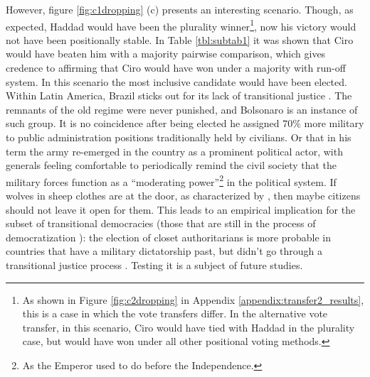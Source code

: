 \documentclass[hidelinks,11pt]{article}
\begin{document}
However, figure \ref{fig:c1dropping} (c) presents an interesting scenario.
Though, as expected, Haddad would have been the plurality winner\footnote{As
  shown in Figure \ref{fig:c2dropping} in Appendix
  \ref{appendix:transfer2_results}, this is a case in which the vote transfers
  differ. In the alternative vote transfer, in this scenario, Ciro would have
  tied with Haddad in the plurality case, but would have won under all other
  positional voting methods.}, now his victory would not have been positionally
stable. In Table \ref{tbl:subtab1} it was shown that Ciro would have
beaten him with a majority pairwise comparison, which gives credence to affirming
that Ciro would have won under a majority with run-off system. In this scenario
the most inclusive candidate would have been elected. Within Latin America,
Brazil sticks out for its lack of transitional justice
\parencite{nalepa2022after}. The remnants of the old regime were never punished,
and Bolsonaro is an instance of such group. It is no coincidence after being
elected he assigned \(70\%\) more military to public administration positions
traditionally held by civilians. Or that in his term the army re-emerged in the
country as a prominent political actor, with generals feeling comfortable to
periodically remind the civil society that the military forces function as a
``moderating power''\footnote{As the Emperor used to do before the
  Independence.} in the political system. If wolves in sheep clothes are at the
door, as characterized by \textcite{chiopris2021wolf}, then maybe citizens
should not leave it open for them. This leads to an empirical implication for
the subset of transitional democracies (those that are still in the process of
democratization \parencite{svolik2008authoritarian}): the election of closet
authoritarians is more probable in countries that have a military dictatorship
past, but didn't go through a transitional justice process
\parencite{geddes1999we}. Testing it is a subject of future studies.







\end{document}
